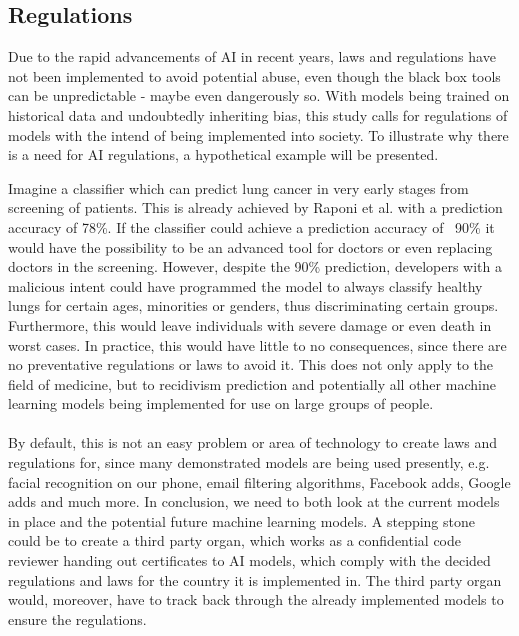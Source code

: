 \documentclass[11pt, fleqn, titlepage]{article}
\newcommand{\1}[1]{\mathds{1}\left[#1\right]}
\begin{document}
\subsection{Regulations}
Due to the rapid advancements of AI in recent years, laws and regulations have not been implemented to avoid potential abuse, even though the black box tools can be unpredictable - maybe even dangerously so. With models being trained on historical data and undoubtedly inheriting bias, this study calls for regulations of models with the intend of being implemented into society. 
To illustrate why there is a need for AI regulations, a hypothetical example will be presented.

Imagine a classifier which can predict lung cancer in very early stages from screening of patients. This is already achieved by Raponi et al. \cite{raponi} with a prediction accuracy of 78\%. If the classifier could achieve a prediction accuracy of ~90\% it would have the possibility to be an advanced tool for doctors or even replacing doctors in the screening. However, despite the 90\% prediction, developers with a malicious intent could have programmed the model to always classify healthy lungs for certain ages, minorities or genders, thus discriminating certain groups. Furthermore, this would leave individuals with severe damage or even death in worst cases. In practice, this would have little to no consequences, since there are no preventative regulations or laws to avoid it. This does not only apply to the field of medicine, but to recidivism prediction \cite{fagproject} and potentially all other machine learning models being implemented for use on large groups of people.
\\\\
By default, this is not an easy problem or area of technology to create laws and regulations for, since many demonstrated models are being used presently, e.g. facial recognition on our phone, email filtering algorithms, Facebook adds, Google adds and much more. In conclusion, we need to both look at the current models in place and the potential future machine learning models. A stepping stone could be to create a third party organ, which works as a confidential code reviewer handing out certificates to AI models, which comply with the decided regulations and laws for the country it is implemented in. The third party organ would, moreover, have to track back through the already implemented models to ensure the regulations.
\end{document}

